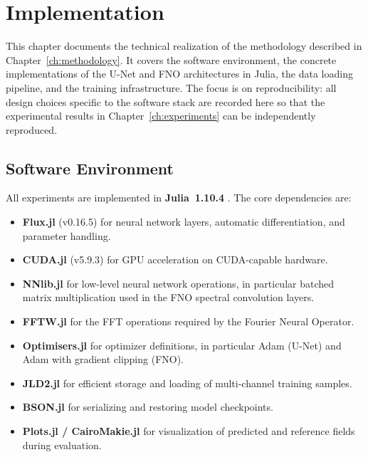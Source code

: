 \chapter{Implementation}
\label{ch:implementation}

This chapter documents the technical realization of the methodology described in Chapter~\ref{ch:methodology}. It covers the software environment, the concrete implementations of the U-Net and FNO architectures in Julia, the data loading pipeline, and the training infrastructure. The focus is on reproducibility: all design choices specific to the software stack are recorded here so that the experimental results in Chapter~\ref{ch:experiments} can be independently reproduced.

\section{Software Environment}

All experiments are implemented in \textbf{Julia~1.10.4} \parencite{bezanson2015juliafreshapproachnumerical}. The core
dependencies are:

\begin{itemize}
    \item \textbf{Flux.jl} (v0.16.5) for neural network layers, automatic
          differentiation, and parameter handling.
    \item \textbf{CUDA.jl} (v5.9.3) for GPU acceleration on CUDA-capable
          hardware.
    \item \textbf{NNlib.jl} for low-level neural network operations, in
          particular batched matrix multiplication used in the FNO spectral
          convolution layers.
    \item \textbf{FFTW.jl} for the FFT operations required
          by the Fourier Neural Operator.
    \item \textbf{Optimisers.jl} for optimizer definitions, in particular
          Adam (U-Net) and Adam with gradient clipping (FNO).
    \item \textbf{JLD2.jl} for efficient storage and loading of multi-channel
          training samples.
    \item \textbf{BSON.jl} for serializing and restoring model checkpoints.
    \item \textbf{Plots.jl / CairoMakie.jl} for visualization of predicted
          and reference fields during evaluation.
\end{itemize}

